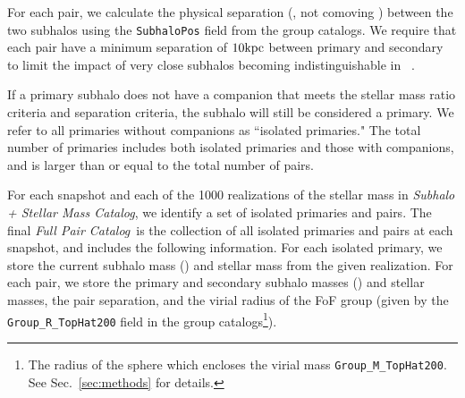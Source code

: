 \documentclass[twocolumn]{aastex631}
\newcommand{\starcat}{\textit{Subhalo + Stellar Mass Catalog}}
\newcommand{\paircat}{\textit{Full Pair Catalog}}
\begin{document}
        For each pair, we calculate the physical separation (\kpc, not comoving \kpc) between the two subhalos using the \texttt{SubhaloPos} field from the group catalogs. We require that each pair have a minimum separation of $10 \mathrm{kpc}$ between primary and secondary to limit the impact of very close subhalos becoming indistinguishable in \subfind~\citep{RG2017}.

        If a primary subhalo does not have a companion that meets the stellar mass ratio criteria and separation criteria, the subhalo will still be considered a primary. 
        We refer to all primaries without companions as ``isolated primaries."
        The total number of primaries includes both isolated primaries and those with companions, and is larger than or equal to the total number of pairs.

        For each snapshot and each of the 1000 realizations of the stellar mass in \starcat, we identify a set of isolated primaries and pairs. 
        The final \paircat\ is the collection of all isolated primaries and pairs at each snapshot, and includes the following information. 
        For each isolated primary, we store the current subhalo mass (\Mhalo) and stellar mass from the given realization. 
        For each pair, we store the primary and secondary subhalo masses (\Mhalo) and stellar masses, the pair separation, and the virial radius of the FoF group (given by the \texttt{Group\_R\_TopHat200} field in the group catalogs\footnote{The radius of the sphere which encloses the virial mass \texttt{Group\_M\_TopHat200}. See Sec.~\ref{sec:methods} for details.}). 
        

\end{document}
